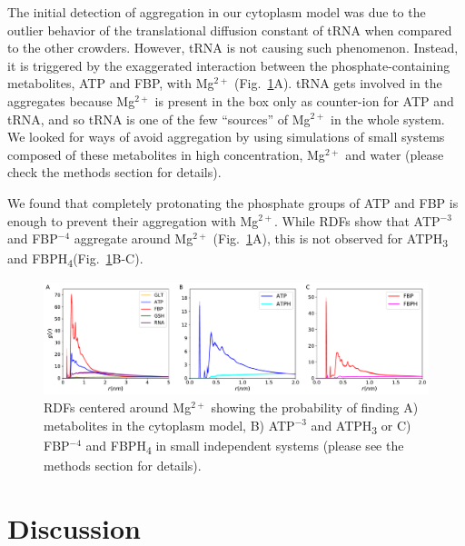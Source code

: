 \documentclass[journal=jacsat,manuscript=article]{achemso}
\begin{document}
The initial detection of aggregation in our cytoplasm model was due to the outlier behavior of the translational diffusion constant of tRNA when compared to the other crowders. However, tRNA is not causing such phenomenon. Instead, it is triggered by the exaggerated interaction between the phosphate-containing metabolites, ATP and FBP, with Mg$^{2+}$ (Fig.~\ref{fig:avoiding_aggregation}A). tRNA gets involved in the aggregates because Mg$^{2+}$ is present in the box only as counter-ion for ATP and tRNA, and so tRNA is one of the few ``sources'' of Mg$^{2+}$ in the whole system. We looked for ways of avoid aggregation by using simulations of small systems composed of these metabolites in high concentration, Mg$^{2+}$ and water (please check the methods section for details).

We found that completely protonating the phosphate groups of ATP and FBP is enough to prevent their aggregation with Mg$^{2+}$. While RDFs show that ATP$^{-3}$ and FBP$^{-4}$ aggregate around Mg$^{2+}$ (Fig.~\ref{fig:avoiding_aggregation}A), this is not observed for ATPH\textsubscript{3} and FBPH\textsubscript{4}(Fig.~\ref{fig:avoiding_aggregation}B-C).

\begin{figure}[H]
\hspace*{-2cm}\includegraphics[scale=0.5]{rdf_mg.pdf}
\caption{RDFs centered around Mg$^{2+}$ showing the probability of finding A) metabolites in the cytoplasm model, B) ATP$^{-3}$ and ATPH\textsubscript{3} or C) FBP$^{-4}$ and FBPH\textsubscript{4} in small independent systems (please see the methods section for details).}
\label{fig:avoiding_aggregation}
\end{figure}


 

\section*{Discussion}\label{sec:dissc}
\end{document}
